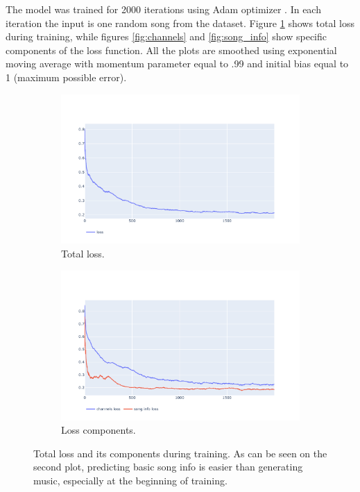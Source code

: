 \documentclass[en]{pracamgr}
\begin{document}
The model was trained for 2000 iterations using Adam optimizer \cite{adam}.
In each iteration the input is one random song from the dataset. Figure \ref{fig:total} shows total loss during training, while figures \ref{fig:channels} and \ref{fig:song_info} show specific components of the loss function. All the plots are smoothed using exponential moving average with momentum parameter equal to .99 and initial bias equal to 1 (maximum possible error).

\begin{figure}
    \centering
    \begin{subfigure}{.5\linewidth}
        \includegraphics[width=\linewidth]{figures/training.pdf}
        \caption{Total loss.}
    \end{subfigure}%
    \begin{subfigure}{.5\linewidth}
        \includegraphics[width=\linewidth]{figures/total.pdf}
        \caption{Loss components.}
    \end{subfigure}%
    \caption{Total loss and its components during training. As can be seen on the second plot, predicting basic song info is easier than generating music, especially at the beginning of training.}
    \label{fig:total}
\end{figure}
\end{document}

